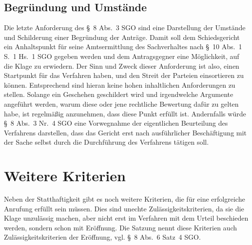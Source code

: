 \subsection{Begründung und Umstände}
\label{Anrufung:Statthaftigkeit:Gruende}
Die letzte Anforderung des \S~8 Abs.~3 SGO sind eine Darstellung der Umstände und Schilderung einer Begründung der Anträge.
Damit soll dem Schiedsgericht ein Anhaltspunkt für seine Amtsermittlung des Sachverhaltes nach \S~10 Abs.~1 S.~1 Hs.~1 SGO gegeben werden und dem Antragsgegner eine Möglichkeit, auf die Klage zu erwiedern.
Der Sinn und Zweck dieser Anforderung ist also, einen Startpunkt für das Verfahren haben, und den Streit der Parteien einsortieren zu können.
Entsprechend sind hieran keine hohen inhaltlichen Anforderungen zu stellen.
Solange ein Geschehen geschildert wird und irgendwelche Argumente angeführt werden, warum diese oder jene rechtliche Bewertung dafür zu gelten habe, ist regelmäßig anzunehmen, dass diese Punkt erfüllt ist.
Andernfalls würde \S~8 Abs.~3 Nr.~4 SGO eine Vorwegnahme der eigentlichen Beurteilung des Verfahrens darstellen, dass das Gericht erst nach ausführlicher Beschäftigung mit der Sache selbst durch die Durchführung des Verfahrens tätigen soll.

\section{Weitere Kriterien}
\label{Anrufung:Kriterien}
Neben der Statthaftigkeit gibt es noch weitere Kriterien, die für eine erfolgreiche Anrufung erfüllt sein müssen.
Dies sind unechte Zulässigkeitskriterien, da sie die Klage unzulässig machen, aber nicht erst im Verfahren mit dem Urteil beschieden werden, sondern schon mit Eröffnung.
Die Satzung nennt diese Kriterien auch Zulässigkeitskriterien der Eröffnung, vgl. \S~8 Abs.~6 Satz~4 SGO.

